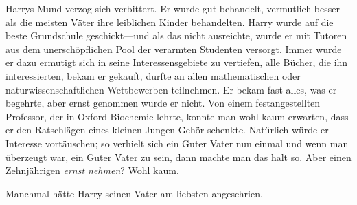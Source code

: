 Harrys Mund verzog sich verbittert. Er wurde gut behandelt, vermutlich besser als die meisten Väter ihre leiblichen Kinder behandelten. Harry wurde auf die beste Grundschule geschickt—und als das nicht ausreichte, wurde er mit Tutoren aus dem unerschöpflichen Pool der verarmten Studenten versorgt. Immer wurde er dazu ermutigt sich in seine Interessensgebiete zu vertiefen, alle Bücher, die ihn interessierten, bekam er gekauft, durfte an allen mathematischen oder naturwissenschaftlichen Wettbewerben teilnehmen. Er bekam fast alles, was er begehrte, aber ernst genommen wurde er nicht. Von einem festangestellten Professor, der in Oxford Biochemie lehrte, konnte man wohl kaum erwarten, dass er den Ratschlägen eines kleinen Jungen Gehör schenkte. Natürlich würde er Interesse vortäuschen; so verhielt sich ein Guter Vater nun einmal und wenn man überzeugt war, ein Guter Vater zu sein, dann machte man das halt so. Aber einen Zehnjährigen \emph{ernst nehmen}? Wohl kaum.

Manchmal hätte Harry seinen Vater am liebsten angeschrien.

